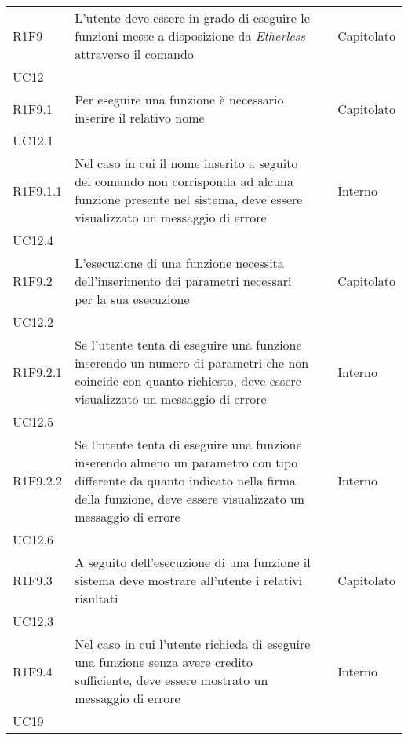 \begin{longtable}{ 
		>{\centering}p{} 
		>{}p{} 
		>{\centering}p{}
		>{\centering}p{} }
	R1F9 & L'utente deve essere in grado di eseguire le funzioni messe a 
		disposizione da \textit{Etherless} attraverso il comando \run{}				& \ob & Capitolato \\ UC12 \tabularnewline
	R1F9.1 & Per eseguire una funzione è necessario inserire il relativo nome 		& \ob & Capitolato \\ UC12.1 \tabularnewline
	R1F9.1.1 & Nel caso in cui il nome inserito a seguito del comando \run{} non 
		corrisponda ad alcuna funzione presente nel sistema, deve essere 
		visualizzato un messaggio di errore											& \ob & Interno \\ UC12.4 \tabularnewline 
	R1F9.2 & L'esecuzione di una funzione necessita dell'inserimento dei parametri 
		necessari per la sua esecuzione												& \ob & Capitolato \\ UC12.2 \tabularnewline
	R1F9.2.1 & Se l'utente tenta di eseguire una funzione inserendo un numero 
		di parametri che non coincide con quanto richiesto, deve essere 
		visualizzato un messaggio di errore 										& \ob & Interno \\ UC12.5 \tabularnewline
	R1F9.2.2 & Se l'utente tenta di eseguire una funzione inserendo almeno un parametro 
		con tipo differente da quanto indicato nella firma della funzione, deve essere 
		visualizzato un messaggio di errore 										& \ob & Interno \\ UC12.6 \tabularnewline
	R1F9.3 & A seguito dell'esecuzione di una funzione il sistema deve mostrare 
		all'utente i relativi risultati 											& \ob & Capitolato \\ UC12.3 \tabularnewline
	R1F9.4 & Nel caso in cui l'utente richieda di eseguire una funzione senza 
		avere credito sufficiente, deve essere mostrato un messaggio di errore		& \ob & Interno \\ UC19 \tabularnewline
	

\end{longtable}
